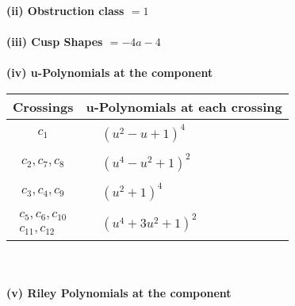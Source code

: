 \documentclass[1p]{elsarticle_modified}
\theoremstyle{definition}
\begin{document}
\flushleft \textbf{(ii) Obstruction class $= 1$}\\~\\
\flushleft \textbf{(iii) Cusp Shapes $= -4 a-4$}\\~\\
\newpage\renewcommand{\arraystretch}{1}
\flushleft \textbf{(iv) u-Polynomials at the component}\newline \\
\begin{tabular}{m{50pt}|m{274pt}}
Crossings & \hspace{64pt}u-Polynomials at each crossing \\
\hline $$\begin{aligned}c_{1}\end{aligned}$$&$\begin{aligned}
&(u^2- u+1)^4
\end{aligned}$\\
\hline $$\begin{aligned}c_{2},c_{7},c_{8}\end{aligned}$$&$\begin{aligned}
&(u^4- u^2+1)^2
\end{aligned}$\\
\hline $$\begin{aligned}c_{3},c_{4},c_{9}\end{aligned}$$&$\begin{aligned}
&(u^2+1)^4
\end{aligned}$\\
\hline $$\begin{aligned}c_{5},c_{6},c_{10}\\c_{11},c_{12}\end{aligned}$$&$\begin{aligned}
&(u^4+3 u^2+1)^2
\end{aligned}$\\
\hline
\end{tabular}\\~\\
\newpage\renewcommand{\arraystretch}{1}
\flushleft \textbf{(v) Riley Polynomials at the component}\newline \\
\end{document}
